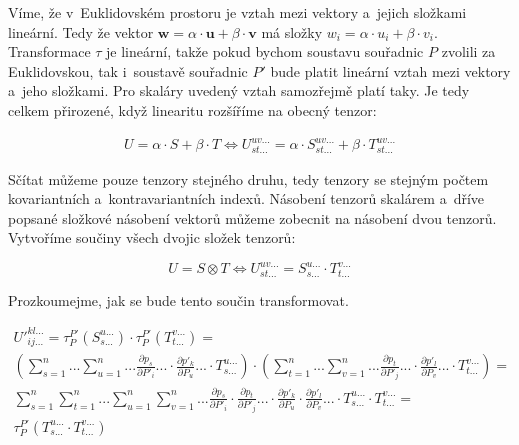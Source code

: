 \documentclass{book}
\newcommand{\vect}[1]{\boldsymbol{#1}}
\begin{document}
Víme, že v~Euklidovském prostoru je vztah mezi vektory a~jejich složkami lineární. Tedy že vektor \(\vect{w} = \alpha \cdot \vect{u} + \beta \cdot \vect{v}\) má složky \(w_i = \alpha \cdot u_i + \beta \cdot v_i\). Transformace \(\tau\) je lineární, takže pokud bychom soustavu souřadnic \(P\) zvolili za Euklidovskou, tak i~soustavě souřadnic \(P'\) bude platit lineární vztah mezi vektory a~jeho složkami. Pro skaláry uvedený vztah samozřejmě platí taky. Je tedy celkem přirozené, když linearitu rozšíříme na obecný tenzor:

\begin{equation}
\label{eq:scitani_a_nasobeni_tenzoru}
\begin{split}
U = \alpha \cdot S + \beta \cdot T \Leftrightarrow U_{st...}^{uv...} = \alpha \cdot S_{st...}^{uv...} + \beta \cdot T_{st...}^{uv...}
\end{split}
\end{equation}

Sčítat můžeme pouze tenzory stejného druhu, tedy tenzory se stejným počtem kovariantních a~kontravariantních indexů. Násobení tenzorů skalárem a~dříve popsané složkové násobení vektorů můžeme zobecnit na násobení dvou tenzorů. Vytvoříme součiny všech dvojic složek tenzorů:

\begin{equation}
\label{eq:nasobeni_tenzoru}
U = S \otimes T \Leftrightarrow U_{st...}^{uv...} = S_{s...}^{u...} \cdot T_{t...}^{v...}
\end{equation}

Prozkoumejme, jak se bude tento součin transformovat.

\begin{equation}
\begin{split}
U'^{kl...}_{ij...} = \tau_{P}^{P'}(S_{s...}^{u...}) \cdot \tau_{P}^{P'}(T_{t...}^{v...}) = \\
\left( \sum_{s=1}^n ... \sum_{u=1}^n ... \frac{\partial p_s}{\partial P'_i} ... \cdot \frac{\partial p'_k}{\partial P_u} ... \cdot T_{s...}^{u...} \right) \cdot \left( \sum_{t=1}^n ... \sum_{v=1}^n ... \frac{\partial p_t}{\partial P'_j} ... \cdot \frac{\partial p'_l}{\partial P_v} ... \cdot T_{t...}^{v...} \right) = \\
\sum_{s=1}^n \sum_{t=1}^n ... \sum_{u=1}^n \sum_{v=1}^n ... \frac{\partial p_s}{\partial P'_i} \cdot \frac{\partial p_t}{\partial P'_j} ... \cdot \frac{\partial p'_k}{\partial P_u} \cdot \frac{\partial p'_l}{\partial P_v} ... \cdot T_{s...}^{u...} \cdot T_{t...}^{v...} = \\
\tau_{P}^{P'}(T_{s...}^{u...} \cdot T_{t...}^{v...})
\end{split}
\end{equation}
\end{document}
